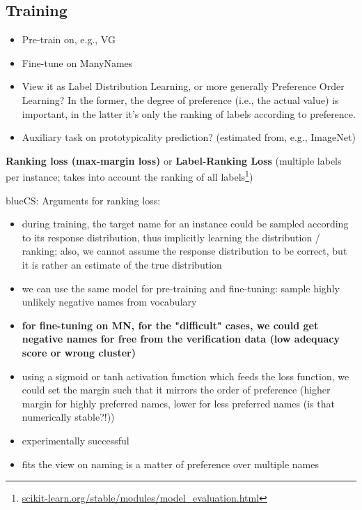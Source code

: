 \documentclass[11pt,a4paper]{article}
\newcommand{\cs}[1]{\begin{color}{blue}CS: #1\end{color}\xspace}
\begin{document}
\subsection{Training}
\label{ssec:model_training}
\begin{itemize}
	\item Pre-train on, e.g., VG
	\item Fine-tune on ManyNames 
	\item View it as Label Distribution Learning, or more generally Preference Order Learning? In the former, the degree of preference (i.e., the actual value) is important, in the latter it's only the ranking of labels according to preference. 
	\item Auxiliary task on prototypicality prediction? (estimated from, e.g., ImageNet)
\end{itemize}
\textbf{Ranking loss (max-margin loss)} or \textbf{Label-Ranking Loss} (multiple labels per instance; takes into account the ranking of all labels\footnote{\url{scikit-learn.org/stable/modules/model_evaluation.html}})\\
\cs{Arguments for ranking loss: 
\begin{itemize}
	\item during training, the target name for an instance could be sampled according to its response distribution, thus implicitly learning the distribution / ranking; also, we cannot assume the response distribution to be correct, but it is rather an estimate of the true distribution
	\item we can use the same model for pre-training and fine-tuning: sample highly unlikely negative names from vocabulary
	\item \textbf{for fine-tuning on MN, for the "difficult" cases, we could get negative names for free from the verification data (low adequacy score or wrong cluster)}
	\item using a sigmoid or tanh activation function which feeds the loss function, we could set the margin such that it mirrors the order of preference (higher margin for highly preferred names, lower for less preferred names (is that numerically stable?!))
	\item experimentally successful
	\item fits the view on naming is a matter of preference over multiple names
\end{itemize}
}
\end{document}

